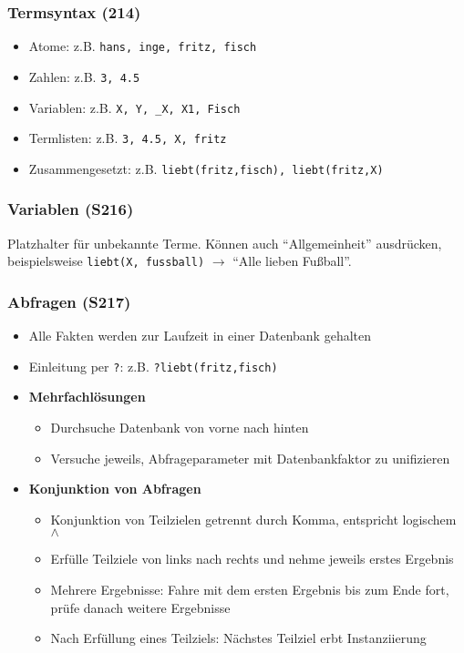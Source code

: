 \subsubsection{Termsyntax (214)}
\begin{itemize}
	\item Atome: z.B. \texttt{hans, inge, fritz, fisch}
	\item Zahlen: z.B. \texttt{3, 4.5}
	\item Variablen: z.B. \texttt{X, Y, \_X, X1, Fisch}
	\item Termlisten: z.B. \texttt{3, 4.5, X, fritz}
	\item Zusammengesetzt: z.B. \texttt{liebt(fritz,fisch), liebt(fritz,X)}
\end{itemize}

\subsubsection{Variablen (S216)}
Platzhalter für unbekannte Terme. Können auch "`Allgemeinheit"' ausdrücken, beispielsweise \texttt{liebt(X, fussball)} \(\rightarrow\) "`Alle lieben Fußball"'.

\subsubsection{Abfragen (S217)}
\begin{itemize}
	\item Alle Fakten werden zur Laufzeit in einer Datenbank gehalten
	\item Einleitung per \texttt{?}: z.B. \texttt{?liebt(fritz,fisch)}
	\item \textbf{Mehrfachlösungen}
	\begin{itemize}
		\item Durchsuche Datenbank von vorne nach hinten
		\item Versuche jeweils, Abfrageparameter mit Datenbankfaktor zu unifizieren
	\end{itemize}
	\item \textbf{Konjunktion von Abfragen}
	\begin{itemize}
		\item Konjunktion von Teilzielen getrennt durch Komma, entspricht logischem \(\wedge\)
		\item Erfülle Teilziele von links nach rechts und nehme jeweils erstes Ergebnis
		\item Mehrere Ergebnisse: Fahre mit dem ersten Ergebnis bis zum Ende fort, prüfe danach weitere Ergebnisse
		\item Nach Erfüllung eines Teilziels: Nächstes Teilziel erbt Instanziierung
	\end{itemize}
\end{itemize}

